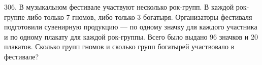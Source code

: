 306. В музыкальном фестивале участвуют несколько рок-групп. В каждой рок-группе либо только 7 гномов, либо только 3 богатыря. Организаторы фестиваля подготовили сувенирную продукцию --- по одному значку для каждого участника и по одному плакату для каждой рок-группы. Всего было выдано 96 значков и 20 плакатов. Сколько групп гномов и сколько групп богатырей участвовало в фестивале?\\
